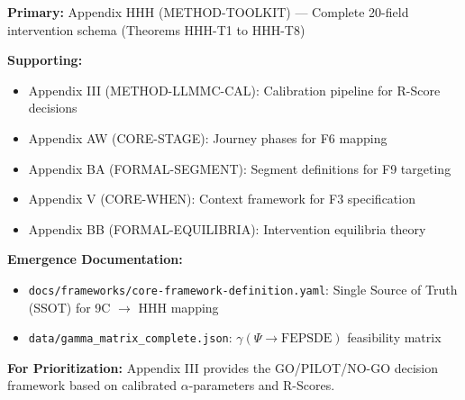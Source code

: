 \begin{tcolorbox}[colback=blue!5!white, colframe=blue!75!black,
    title=Appendix References]
\textbf{Primary:} Appendix HHH (METHOD-TOOLKIT) --- Complete 20-field intervention schema (Theorems HHH-T1 to HHH-T8)

\textbf{Supporting:}
\begin{itemize}[nosep]
\item Appendix III (METHOD-LLMMC-CAL): Calibration pipeline for R-Score decisions
\item Appendix AW (CORE-STAGE): Journey phases for F6 mapping
\item Appendix BA (FORMAL-SEGMENT): Segment definitions for F9 targeting
\item Appendix V (CORE-WHEN): Context framework for F3 specification
\item Appendix BB (FORMAL-EQUILIBRIA): Intervention equilibria theory
\end{itemize}

\textbf{Emergence Documentation:}
\begin{itemize}[nosep]
\item \texttt{docs/frameworks/core-framework-definition.yaml}: Single Source of Truth (SSOT) for 9C $\rightarrow$ HHH mapping
\item \texttt{data/gamma\_matrix\_complete.json}: $\gamma(\Psi \rightarrow \text{FEPSDE})$ feasibility matrix
\end{itemize}

\textbf{For Prioritization:} Appendix III provides the GO/PILOT/NO-GO decision framework
based on calibrated $\alpha$-parameters and R-Scores.
\end{tcolorbox}



